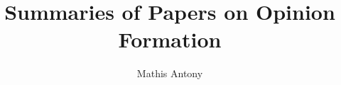 \documentclass[a4paper]{scrartcl}
\begin{document}
\title{Summaries of Papers on Opinion Formation}
\author{Mathis Antony}
\maketitle
{}


\end{document}
